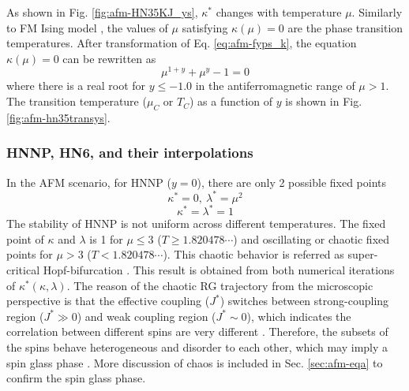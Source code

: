 As shown in Fig. \ref{fig:afm-HN35KJ_ys}, $\kappa^*$ changes with temperature $\mu$. Similarly to FM Ising model \cite{Boettcher2011HNNP}, the values of $\mu$ satisfying $\kappa(\mu)=0$ are the phase transition temperatures. After transformation of Eq. \ref{eq:afm-fyps_k}, the equation $\kappa(\mu)=0$ can be rewritten as 
\begin{equation}
\mu^{1+y} + \mu^y -1 =0
\end{equation}
where there is a real root for $y\le-1.0$ in the antiferromagnetic range of $\mu>1$.  The transition temperature ($\mu_C$ or $T_C$) as a function of $y$ is shown in Fig.  \ref{fig:afm-hn35transys}.


\subsubsection{ HNNP, HN6, and their interpolations }

In the AFM scenario, for HNNP ($y = 0$), there are only 2 possible fixed points 
\begin{equation}
\kappa^* = 0, \ \lambda^* = \mu^2 
\end{equation} 
\begin{equation}
\kappa^* = \lambda^* = 1 
\end{equation} 
 The stability of HNNP is not uniform across different temperatures. The fixed point of $\kappa$ and $\lambda$ is 1 for $\mu \le 3$ ($T\ge1.820478\cdots$) and oscillating or chaotic fixed points for $\mu > 3$ ($T<1.820478\cdots$). This chaotic behavior is referred as super-critical Hopf-bifurcation  \cite{weinrib1983critical}. This result is obtained from both numerical iterations of $\kappa^*(\kappa, \lambda)$. The reason of the chaotic RG trajectory from the microscopic perspective is that the effective coupling ($J^*$) switches between strong-coupling region ($J^*\gg 0$) and weak coupling region ($J^* \sim 0$), which indicates the correlation between different spins are very different \cite{mckay1982spin}. Therefore, the subsets of the spins behave heterogeneous and disorder to each other, which may imply a spin glass phase \cite{mckay1982spin}. More discussion of chaos is included in Sec. \ref{sec:afm-eqa} to confirm the spin glass phase. 



